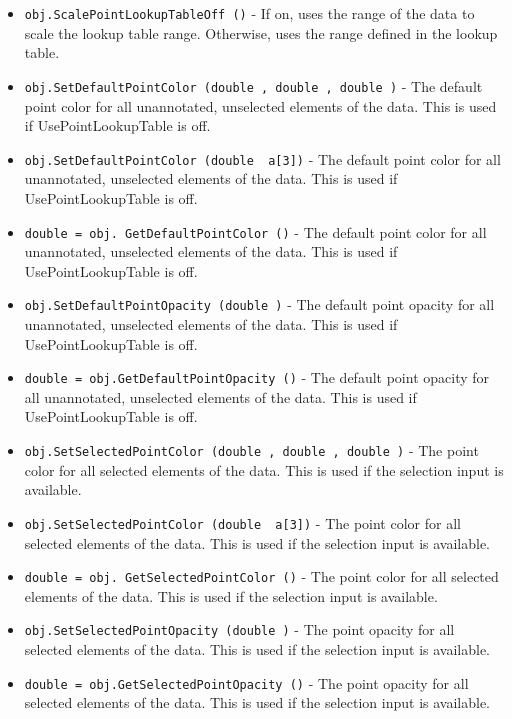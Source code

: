 \begin{itemize}
\item  \verb|obj.ScalePointLookupTableOff ()| -  If on, uses the range of the data to scale the lookup table range.
 Otherwise, uses the range defined in the lookup table.

\item  \verb|obj.SetDefaultPointColor (double , double , double )| -  The default point color for all unannotated, unselected elements
 of the data. This is used if UsePointLookupTable is off.

\item  \verb|obj.SetDefaultPointColor (double  a[3])| -  The default point color for all unannotated, unselected elements
 of the data. This is used if UsePointLookupTable is off.

\item  \verb|double = obj. GetDefaultPointColor ()| -  The default point color for all unannotated, unselected elements
 of the data. This is used if UsePointLookupTable is off.

\item  \verb|obj.SetDefaultPointOpacity (double )| -  The default point opacity for all unannotated, unselected elements
 of the data. This is used if UsePointLookupTable is off.

\item  \verb|double = obj.GetDefaultPointOpacity ()| -  The default point opacity for all unannotated, unselected elements
 of the data. This is used if UsePointLookupTable is off.

\item  \verb|obj.SetSelectedPointColor (double , double , double )| -  The point color for all selected elements of the data.
 This is used if the selection input is available.

\item  \verb|obj.SetSelectedPointColor (double  a[3])| -  The point color for all selected elements of the data.
 This is used if the selection input is available.

\item  \verb|double = obj. GetSelectedPointColor ()| -  The point color for all selected elements of the data.
 This is used if the selection input is available.

\item  \verb|obj.SetSelectedPointOpacity (double )| -  The point opacity for all selected elements of the data.
 This is used if the selection input is available.

\item  \verb|double = obj.GetSelectedPointOpacity ()| -  The point opacity for all selected elements of the data.
 This is used if the selection input is available.


\end{itemize}

